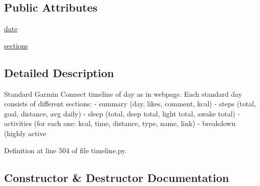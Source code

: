 \subsection*{Public Attributes}
\begin{DoxyCompactItemize}
\item 
\hyperlink{classpygce_1_1models_1_1garmin_1_1timeline_1_1_g_c_day_timeline_a93fbc84cc4bfb4b01ec4678c512dc6f7}{date}
\item 
\hyperlink{classpygce_1_1models_1_1garmin_1_1timeline_1_1_g_c_day_timeline_a2e73f290ffe476624ddc495bb3edd19b}{sections}
\end{DoxyCompactItemize}


\subsection{Detailed Description}
\begin{DoxyVerb}Standard Garmin Connect timeline of day as in webpage.
Each standard day consists of different sections:
- summary (day, likes, comment, kcal)
- steps (total, goal, distance, avg daily)
- sleep (total, deep total, light total, awake total)
- activities (for each one: kcal, time, distance, type, name, link)
- breakdown (highly active %
\end{DoxyVerb}
 

Definition at line 504 of file timeline.\+py.



\subsection{Constructor \& Destructor Documentation}
\mbox{\label{classpygce_1_1models_1_1garmin_1_1timeline_1_1_g_c_day_timeline_a4dd53f447c45ea43629204d32243835e}} 
